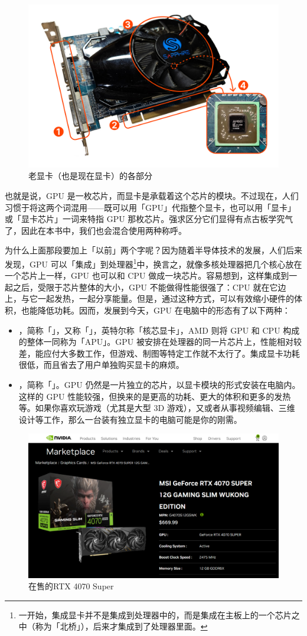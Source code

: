 \begin{figure}[htb!]
  \centering
  \includegraphics[width=.5\textwidth]{assets/basic/GPU_parts.png}
  \caption{老显卡（也是现在显卡）的各部分}
  \label{fig:GPU_parts}
\end{figure}

\begin{note}
  也就是说，GPU 是一枚芯片，而显卡是承载着这个芯片的模块。不过现在，人们习惯于将这两个词混用——既可以用「GPU」代指整个显卡，也可以用「显卡」或「显卡芯片」一词来特指 GPU 那枚芯片。强求区分它们显得有点古板学究气了，因此在本书中，我们也会混合使用两种称呼。
\end{note}

为什么上面那段要加上「以前」两个字呢？因为随着半导体技术的发展，人们后来发现，GPU 可以「集成」到处理器\footnote{一开始，集成显卡并不是集成到处理器中的，而是集成在主板上的一个芯片之中（称为「北桥」），后来才集成到了处理器里面。}中，换言之，就像多核处理器把几个核心放在一个芯片上一样，GPU 也可以和 CPU 做成一块芯片。容易想到，这样集成到一起之后，受限于芯片整体的大小，GPU 不能做得性能很强了：CPU 就在它边上，与它一起发热，一起分享能量。但是，通过这种方式，可以有效缩小硬件的体积，也能降低功耗。因而，发展到今天，GPU 在电脑中的形态有了以下两种：

\begin{itemize}
  \item {}，简称「」，又称「」，英特尔称「核芯显卡」，AMD 则将 GPU 和 CPU 构成的整体一同称为「APU」。GPU 被安排在处理器的同一片芯片上，性能相对较差，能应付大多数工作，但游戏、制图等特定工作就不太行了。集成显卡功耗很低，而且省去了用户单独购买显卡的麻烦。
  \item {}，简称「」。GPU 仍然是一片独立的芯片，以显卡模块的形式安装在电脑内。这样的 GPU 性能较强，但换来的是更高的功耗、更大的体积和更多的发热等。如果你喜欢玩游戏（尤其是大型 3D 游戏），又或者从事视频编辑、三维设计等工作，那么一台装有独立显卡的电脑可能是你的刚需。
\end{itemize}

\begin{figure}[htb!]
  \centering
  \includegraphics[width=.6\textwidth]{assets/basic/4070_storepage.png}
  \caption{在售的RTX 4070 Super}
  \label{fig:4070_storepage}
\end{figure}

